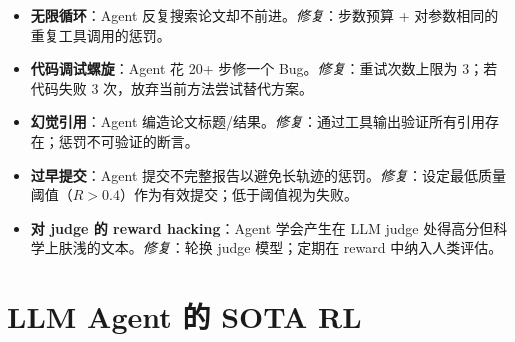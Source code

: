 \begin{warningbox}
\begin{itemize}
  \item \textbf{无限循环}：Agent 反复搜索论文却不前进。\emph{修复}：步数预算 + 对参数相同的重复工具调用的惩罚。
  \item \textbf{代码调试螺旋}：Agent 花 20+ 步修一个 Bug。\emph{修复}：重试次数上限为 3；若代码失败 3 次，放弃当前方法尝试替代方案。
  \item \textbf{幻觉引用}：Agent 编造论文标题/结果。\emph{修复}：通过工具输出验证所有引用存在；惩罚不可验证的断言。
  \item \textbf{过早提交}：Agent 提交不完整报告以避免长轨迹的惩罚。\emph{修复}：设定最低质量阈值（$R > 0.4$）作为有效提交；低于阈值视为失败。
  \item \textbf{对 judge 的 reward hacking}：Agent 学会产生在 LLM judge 处得高分但科学上肤浅的文本。\emph{修复}：轮换 judge 模型；定期在 reward 中纳入人类评估。
\end{itemize}
\end{warningbox}

\section{LLM Agent 的 SOTA RL}
\label{state-of-the-art-rl-for-llm-agents}


